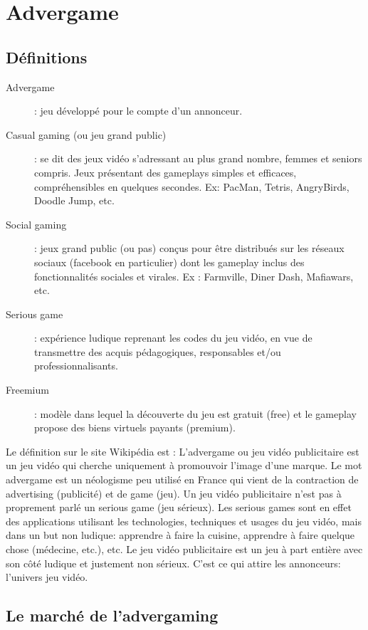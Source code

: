 
\section{Advergame} %
\label{sub:advergame}

\subsection{Définitions} %
\label{ssub:définitions}

\begin{description}
	\item[Advergame] : jeu développé pour le compte d’un annonceur.
	\item[Casual gaming (ou jeu grand public)] : se dit des jeux vidéo s'adressant au plus grand nombre, femmes et seniors compris. Jeux présentant des gameplays simples et efficaces, compréhensibles en quelques secondes. Ex: PacMan, Tetris, AngryBirds, Doodle Jump, etc.
	\item[Social gaming] : jeux grand public (ou pas) conçus pour être distribués sur les réseaux sociaux (facebook en particulier) dont les gameplay inclus des fonctionnalités sociales et virales. Ex : Farmville, Diner Dash, Mafiawars, etc.
	\item[Serious game] : expérience ludique reprenant les codes du jeu vidéo, en vue de transmettre des acquis pédagogiques, responsables et/ou professionnalisants.
	\item[Freemium] : modèle dans lequel la découverte du jeu est gratuit (free) et le gameplay propose des biens virtuels payants (premium).
\end{description}
Le définition sur le site Wikipédia est : L'advergame ou jeu vidéo publicitaire est un jeu vidéo qui cherche uniquement à promouvoir l'image d'une marque. Le mot advergame est un néologisme peu utilisé en France qui vient de la contraction de advertising (publicité) et de game (jeu). Un jeu vidéo publicitaire n'est pas à proprement parlé un serious game (jeu sérieux). Les serious games sont en effet des applications utilisant les technologies, techniques et usages du jeu vidéo, mais dans un but non ludique: apprendre à faire la cuisine, apprendre à faire quelque chose (médecine, etc.), etc.
Le jeu vidéo publicitaire est un jeu à part entière avec son côté ludique et justement non sérieux. C'est ce qui attire les annonceurs: l'univers jeu vidéo.


\subsection{Le marché de l'advergaming} %
\label{ssub:le_marché_de_l_advergame}

